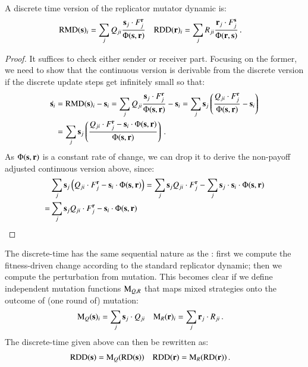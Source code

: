 \begin{claim} A discrete time version of the replicator mutator
  dynamic is:
  \begin{align*}
    \mathrm{RMD}(\mathrm{\mathbf{s}})_i & = \sum_{j} Q_{ji} \frac{\mathrm{\mathbf{s}}_j \cdot
      F_j^{\mathrm{\mathbf{r}}}}{ \Phi(\mathrm{\mathbf{s}},\mathrm{\mathbf{r}})} & \mathrm{RDD}(\mathrm{\mathbf{r}})_i & =
    \sum_{j} R_{ji} \frac{\mathrm{\mathbf{r}}_j \cdot F_j^{\mathrm{\mathbf{s}}}}{
      \Phi(\mathrm{\mathbf{r}},\mathrm{\mathbf{s}})}\,.
  \end{align*}
\end{claim}


\begin{proof}
  It suffices to check either sender or receiver part. Focusing on the
  former, we need to show that the continuous version is derivable
  from the discrete version if the discrete update steps get
  infinitely small so that:
  \begin{align*}
    \dot{\mathrm{\mathbf{s}}_i} & = \mathrm{RMD}(\mathrm{\mathbf{s}})_i - \mathrm{\mathbf{s}}_i = \sum_{j} Q_{ji}
    \frac{\mathrm{\mathbf{s}}_j \cdot F_j^{\mathrm{\mathbf{r}}}}{ \Phi(\mathrm{\mathbf{s}},\mathrm{\mathbf{r}})} -
    \mathrm{\mathbf{s}}_i = \sum_{j} \mathrm{\mathbf{s}}_j \left ( \frac{ Q_{ji} \cdot
        F_j^{\mathrm{\mathbf{r}}}}{ \Phi(\mathrm{\mathbf{s}},\mathrm{\mathbf{r}})} - \mathrm{\mathbf{s}}_i \right ) \\
    & = \sum_{j} \mathrm{\mathbf{s}}_j \left ( \frac{ Q_{ji} \cdot
        F_j^{\mathrm{\mathbf{r}}} - \mathrm{\mathbf{s}}_i \cdot \Phi(\mathrm{\mathbf{s}},\mathrm{\mathbf{r}})}{ \Phi(\mathrm{\mathbf{s}},\mathrm{\mathbf{r}})}  \right )\,.
  \end{align*}
  As $\Phi(\mathrm{\mathbf{s}},\mathrm{\mathbf{r}})$ is a constant rate of change, we can drop
  it to derive the non-payoff adjusted continuous version above,
  since:
  \begin{align*}
    & \sum_{j} \mathrm{\mathbf{s}}_j \left ( Q_{ji} \cdot
        F_j^{\mathrm{\mathbf{r}}} - \mathrm{\mathbf{s}}_i \cdot \Phi(\mathrm{\mathbf{s}},\mathrm{\mathbf{r}})  \right
      ) =     \sum_{j} \mathrm{\mathbf{s}}_j  Q_{ji} \cdot
        F_j^{\mathrm{\mathbf{r}}} - \sum_{j} \mathrm{\mathbf{s}}_j \cdot \mathrm{\mathbf{s}}_i \cdot
        \Phi(\mathrm{\mathbf{s}},\mathrm{\mathbf{r}}) \\
       = &    \sum_{j} \mathrm{\mathbf{s}}_j  Q_{ji} \cdot
        F_j^{\mathrm{\mathbf{r}}} - \mathrm{\mathbf{s}}_i \cdot
        \Phi(\mathrm{\mathbf{s}},\mathrm{\mathbf{r}}) 
  \end{align*}
\end{proof}

The discrete-time \rmd has the same sequential nature as the \rdd:
first we compute the fitness-driven change according to the standard
replicator dynamic; then we compute the perturbation from
mutation. This becomes clear if we define independent mutation
functions $\mathrm{M}_{Q,R}$ that maps mixed strategies onto the outcome
of (one round of) mutation:
\begin{align*}
  \mathrm{M}_Q(\mathrm{\mathbf{s}})_i & =  \sum_j  \mathrm{\mathbf{s}}_j \cdot
  Q_{ji} &   \mathrm{M}_R(\mathrm{\mathbf{r}})_i & =  \sum_{j}  \mathrm{\mathbf{r}}_j \cdot
  R_{ji} \,.
\end{align*}
The discrete-time \rmd given above can then be rewritten as:
\begin{align*}
  \mathrm{RDD}(\mathrm{\mathbf{s}}) &= \mathrm{M}_Q(\mathrm{RD}(\mathrm{\mathbf{s}})) &   \mathrm{RDD}(\mathrm{\mathbf{r}}) &= \mathrm{M}_R(\mathrm{RD}(\mathrm{\mathbf{r}}))\,. 
\end{align*}



